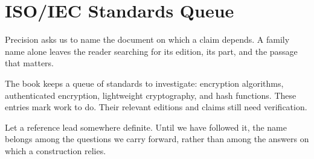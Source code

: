 \chapter{ISO/IEC Standards Queue}
\label{short:standards}

Precision asks us to name the document on which a claim depends. A family
name alone leaves the reader searching for its edition, its part, and the
passage that matters.

The book keeps a queue of standards to investigate: encryption algorithms,
authenticated encryption, lightweight cryptography, and hash functions.
These entries mark work to do. Their relevant editions and claims still
need verification.

Let a reference lead somewhere definite. Until we have followed it, the
name belongs among the questions we carry forward, rather than among the
answers on which a construction relies.

